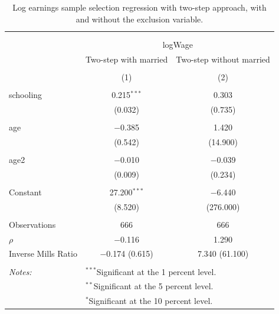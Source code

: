 \documentclass[
]{article}
\begin{document}
\begin{table}[!htbp] \centering 
  \caption{Log earnings sample selection regression with two-step approach, 
          with and without the exclusion variable.} 
  \label{tab:q1_d} 
\small 
\begin{tabular}{@{\extracolsep{5pt}}lcc} 
\\[-1.8ex]\hline 
\hline \\[-1.8ex] 
\\[-1.8ex] & \multicolumn{2}{c}{logWage} \\ 
 & Two-step with married & Two-step without married \\ 
\\[-1.8ex] & (1) & (2)\\ 
\hline \\[-1.8ex] 
 schooling & 0.215$^{***}$ & 0.303 \\ 
  & (0.032) & (0.735) \\ 
  & & \\ 
 age & $-$0.385 & 1.420 \\ 
  & (0.542) & (14.900) \\ 
  & & \\ 
 age2 & $-$0.010 & $-$0.039 \\ 
  & (0.009) & (0.234) \\ 
  & & \\ 
 Constant & 27.200$^{***}$ & $-$6.440 \\ 
  & (8.520) & (276.000) \\ 
  & & \\ 
Observations & 666 & 666 \\ 
$\rho$ & $-$0.116 & 1.290 \\ 
Inverse Mills Ratio & $-$0.174  (0.615) & 7.340  (61.100) \\ 
\hline \\[-1.8ex] 
\textit{Notes:} & \multicolumn{2}{l}{$^{***}$Significant at the 1 percent level.} \\ 
 & \multicolumn{2}{l}{$^{**}$Significant at the 5 percent level.} \\ 
 & \multicolumn{2}{l}{$^{*}$Significant at the 10 percent level.} \\ 
\end{tabular} 
\end{table}
\end{document}

